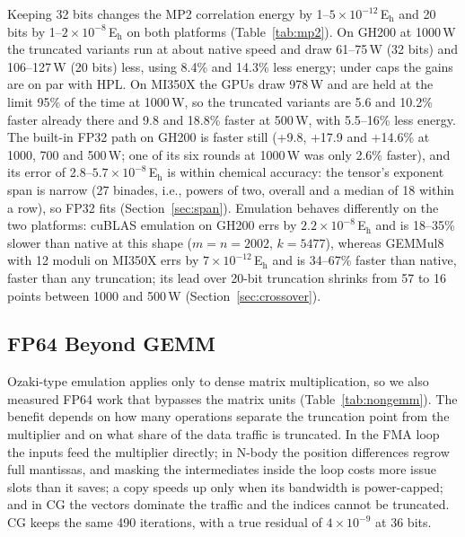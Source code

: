 \documentclass[conference]{IEEEtran}
\newcommand{\W}{\,W}
\newcommand{\Eh}{\,E$_\mathrm{h}$}
\newcommand{\ee}[2]{#1{\times}10^{#2}}  %
\newcommand{\pct}{\%}
\begin{document}
Keeping 32 bits changes the MP2 correlation energy by 1--$\ee{5}{-12}$\Eh{} and 20 bits by 1--$\ee{2}{-8}$\Eh{} on both
platforms (Table~\ref{tab:mp2}). On GH200 at 1000\W{} the truncated variants run at about native speed and draw
61--75\W{} (32 bits) and 106--127\W{} (20 bits) less, using 8.4\pct{} and 14.3\pct{} less energy; under caps the gains
are on par with HPL. On MI350X the GPUs draw 978\W{} and are held at the limit 95\pct{} of the time at 1000\W, so the
truncated variants are 5.6 and 10.2\pct{} faster already there and 9.8 and 18.8\pct{} faster at 500\W, with 5.5--16\pct{}
less energy. The built-in FP32 path on GH200 is faster still (+9.8, +17.9 and +14.6\pct{} at 1000, 700 and 500\W; one of
its six rounds at 1000\W{} was only 2.6\pct{} faster), and its error of 2.8--$\ee{5.7}{-8}$\Eh{} is within chemical
accuracy: the tensor's exponent span is narrow (27 binades, i.e., powers of two, overall and a median of 18 within a
row), so FP32 fits (Section~\ref{sec:span}). Emulation behaves differently on the two platforms: cuBLAS emulation on
GH200 errs by $\ee{2.2}{-8}$\Eh{} and is 18--35\pct{} slower than native at this shape ($m=n=2002$, $k=5477$), whereas
GEMMul8 with 12 moduli on MI350X errs by $\ee{7}{-12}$\Eh{} and is 34--67\pct{} faster than native, faster than any
truncation; its lead over 20-bit truncation shrinks from 57 to 16 points between 1000 and 500\W{}
(Section~\ref{sec:crossover}).

\subsection{FP64 Beyond GEMM}\label{sec:nongemm}

Ozaki-type emulation applies only to dense matrix multiplication, so we also measured FP64 work that bypasses the
matrix units (Table~\ref{tab:nongemm}). The benefit depends on how many operations separate the truncation point
from the multiplier and on what share of the data traffic is truncated. In the FMA loop the inputs feed the
multiplier directly; in N-body the position differences regrow full mantissas, and masking the intermediates inside
the loop costs more issue slots than it saves; a copy speeds up only when its bandwidth is power-capped; and in CG
the vectors dominate the traffic and the indices cannot be truncated. CG keeps the same 490 iterations, with a true
residual of $\ee{4}{-9}$ at 36 bits.
\end{document}
